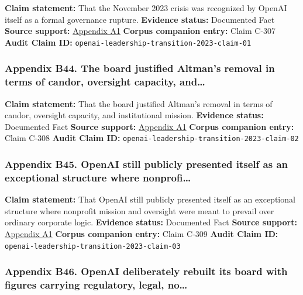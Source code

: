 \documentclass[
  american,
  11pt,
  letterpaper,
]{article}
\begin{document}
\textbf{Claim statement:} That the November 2023 crisis was recognized
by OpenAI itself as a formal governance rupture. \textbf{Evidence
status:} Documented Fact \textbf{Source support:}
\hyperref[ch-08-appendix-a1-openai-announces-leadership-transition]{Appendix
A1} \textbf{Corpus companion entry:} Claim C-307 \textbf{Audit Claim
ID:} \texttt{openai-leadership-transition-2023-claim-01}

\subsubsection{Appendix B44. The board justified Altman's removal in
terms of candor, oversight capacity,
and\ldots{}}\label{ch-08-appendix-b44-the-board-justified-altmans-removal-in-terms-of-candor-oversight-capacity-and}

\textbf{Claim statement:} That the board justified Altman's removal in
terms of candor, oversight capacity, and institutional mission.
\textbf{Evidence status:} Documented Fact \textbf{Source support:}
\hyperref[ch-08-appendix-a1-openai-announces-leadership-transition]{Appendix
A1} \textbf{Corpus companion entry:} Claim C-308 \textbf{Audit Claim
ID:} \texttt{openai-leadership-transition-2023-claim-02}

\subsubsection{Appendix B45. OpenAI still publicly presented itself as
an exceptional structure where
nonprofi\ldots{}}\label{ch-08-appendix-b45-openai-still-publicly-presented-itself-as-an-exceptional-structure-where-nonprofi}

\textbf{Claim statement:} That OpenAI still publicly presented itself as
an exceptional structure where nonprofit mission and oversight were
meant to prevail over ordinary corporate logic. \textbf{Evidence
status:} Documented Fact \textbf{Source support:}
\hyperref[ch-08-appendix-a1-openai-announces-leadership-transition]{Appendix
A1} \textbf{Corpus companion entry:} Claim C-309 \textbf{Audit Claim
ID:} \texttt{openai-leadership-transition-2023-claim-03}

\subsubsection{Appendix B46. OpenAI deliberately rebuilt its board with
figures carrying regulatory, legal,
no\ldots{}}\label{ch-08-appendix-b46-openai-deliberately-rebuilt-its-board-with-figures-carrying-regulatory-legal-no}
\end{document}
